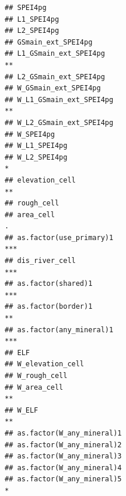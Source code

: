 \documentclass[
  a4paper,
]{article}
\begin{document}
\begin{verbatim}
## SPEI4pg                                                                              
## L1_SPEI4pg                                                                           
## L2_SPEI4pg                                                                           
## GSmain_ext_SPEI4pg                                                                   
## L1_GSmain_ext_SPEI4pg                                                             ** 
## L2_GSmain_ext_SPEI4pg                                                                
## W_GSmain_ext_SPEI4pg                                                                 
## W_L1_GSmain_ext_SPEI4pg                                                           ** 
## W_L2_GSmain_ext_SPEI4pg                                                              
## W_SPEI4pg                                                                            
## W_L1_SPEI4pg                                                                         
## W_L2_SPEI4pg                                                                      *  
## elevation_cell                                                                    ** 
## rough_cell                                                                           
## area_cell                                                                         .  
## as.factor(use_primary)1                                                           ***
## dis_river_cell                                                                    ***
## as.factor(shared)1                                                                ***
## as.factor(border)1                                                                ** 
## as.factor(any_mineral)1                                                           ***
## ELF                                                                                  
## W_elevation_cell                                                                     
## W_rough_cell                                                                         
## W_area_cell                                                                       ** 
## W_ELF                                                                             ** 
## as.factor(W_any_mineral)1                                                            
## as.factor(W_any_mineral)2                                                            
## as.factor(W_any_mineral)3                                                            
## as.factor(W_any_mineral)4                                                            
## as.factor(W_any_mineral)5                                                         *  

\end{verbatim}
\end{document}
